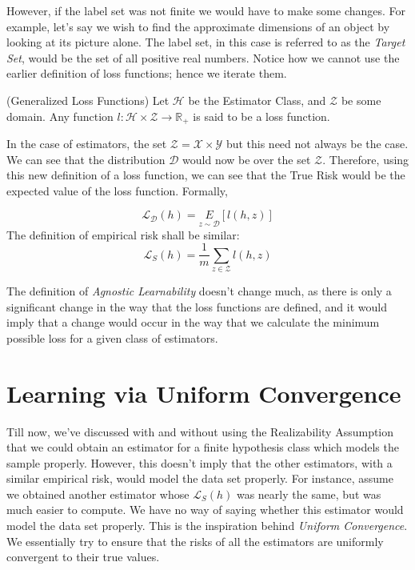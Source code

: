 \documentclass[11pt,oneside,onemany]{book} %
\begin{document}
However, if the label set was not finite we would have to make some changes. For example, let's say we wish to find the approximate dimensions of an object by looking at its picture alone. The label set, in this case is referred to as the \emph{Target Set}, would be the set of all positive real numbers. Notice how we cannot use the earlier definition of loss functions; hence we iterate them.\\

\begin{definition}
(Generalized Loss Functions) Let $\mathcal{H}$ be the Estimator Class, and $\mathcal{Z}$ be some domain. Any function $l:\mathcal{H}\times\mathcal{Z}\rightarrow\mathbb{R}_+$ is said to be a loss function.
\end{definition}

In the case of estimators, the set $\mathcal{Z} = \mathcal{X}\times\mathcal{Y}$ but this need not always be the case. We can see that the distribution $\mathcal{D}$ would now be over the set $\mathcal{Z}$. Therefore, using this new definition of a loss function, we can see that the True Risk would be the expected value of the loss function. Formally,

$$
\mathcal{L}_\mathcal{D}(h) = \underset{z\sim \mathcal{D}}{E}[l(h,z)]
$$
The definition of empirical risk shall be similar:
$$
\mathcal{L}_S(h) = \frac{1}{m}\sum_{z\in \mathcal{Z}}l(h,z)
$$

The definition of \emph{Agnostic Learnability} doesn't change much, as there is only a significant change in the way that the loss functions are defined, and it would imply that a change would occur in the way that we calculate the minimum possible loss for a given class of estimators.
\newpage
\section{Learning via Uniform Convergence}
Till now, we've discussed with and without using the Realizability Assumption that we could obtain an estimator for a finite hypothesis class which models the sample properly. However, this doesn't imply that the other estimators, with a similar empirical risk, would model the data set properly. For instance, assume we obtained another estimator whose $\mathcal{L}_S(h)$ was nearly the same, but was much easier to compute. We have no way of saying whether this estimator would model the data set properly. This is the inspiration behind \emph{Uniform Convergence}. We essentially try to ensure that the risks of all the estimators are uniformly convergent to their true values.\\
\end{document}
